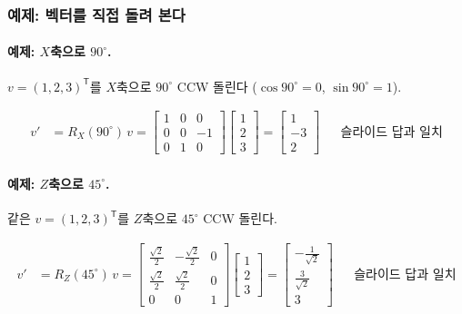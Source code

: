 \subsubsection{예제: 벡터를 직접 돌려 본다}
\label{sec:lec02-rotation-examples}

\paragraph{예제: $X$축으로 $90^\circ$.}
$v = (1, 2, 3)^{\mathsf{T}}$를 $X$축으로 $90^\circ$ CCW 돌린다
($\cos 90^\circ = 0$, $\sin 90^\circ = 1$).

\begin{align*}
v' &= R_X(90^\circ)\,v
   = \begin{bmatrix} 1 & 0 & 0 \\ 0 & 0 & -1 \\ 0 & 1 & 0 \end{bmatrix}
     \begin{bmatrix} 1 \\ 2 \\ 3 \end{bmatrix}
   = \begin{bmatrix} 1 \\ -3 \\ 2 \end{bmatrix}
   && \text{슬라이드 답과 일치}
\end{align*}

\paragraph{예제: $Z$축으로 $45^\circ$.}
같은 $v = (1, 2, 3)^{\mathsf{T}}$를 $Z$축으로 $45^\circ$ CCW 돌린다.

\begin{align*}
v' &= R_Z(45^\circ)\,v
   = \begin{bmatrix}
       \tfrac{\sqrt2}{2} & -\tfrac{\sqrt2}{2} & 0 \\
       \tfrac{\sqrt2}{2} & \tfrac{\sqrt2}{2} & 0 \\
       0 & 0 & 1
     \end{bmatrix}
     \begin{bmatrix} 1 \\ 2 \\ 3 \end{bmatrix}
   = \begin{bmatrix} -\tfrac{1}{\sqrt2} \\ \tfrac{3}{\sqrt2} \\ 3 \end{bmatrix}
   && \text{슬라이드 답과 일치}
\end{align*}

